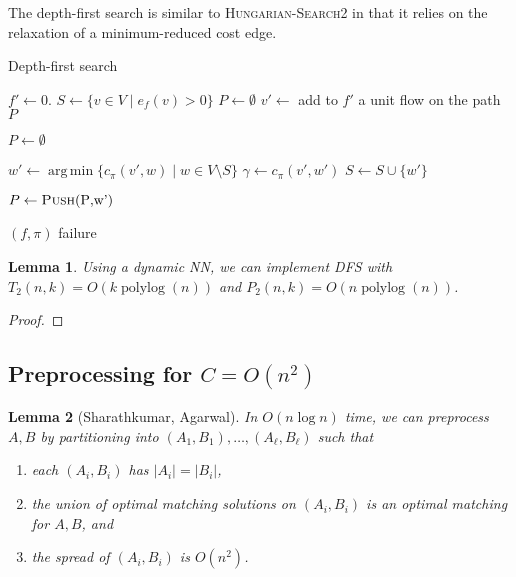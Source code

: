 \documentclass[11pt]{article}
\def\polylog{\mathop{\mathrm{polylog}}}
\DeclareMathOperator*{\argmin}{arg\,min}
\theoremstyle{plain}
\newtheorem{lemma}{Lemma}
\begin{document}
The depth-first search is similar to \textsc{Hungarian-Search2} in that it 
relies on the relaxation of a minimum-reduced cost edge.
\begin{algorithm}
\caption{Depth-first search}
\begin{algorithmic}[1]
	\State $f' \gets 0$.
	\State $S \gets \{v \in V \mid e_f(v) > 0\}$
	\State $P \gets \emptyset$
	\Repeat
		\State $v' \gets$ 
			\State add to $f'$ a unit flow on the path $P$
			
			\State $P \gets \emptyset$
		\EndIf

		\Statex %
		\State $w' \gets \argmin\{c_\pi(v', w) \mid w \in V \setminus S\}$
		\State $\gamma \gets c_\pi(v', w')$
		\Statex %
			\State $S \gets S \cup \{w'\}$
			
			\State $P \gets \Call{Push}{$P$, $w'$}$

		\EndIf




		 
			\State\Return $(f, \pi)$
		\EndIf
	\State\Return failure
\EndFunction
\end{algorithmic}
\end{algorithm}


\begin{lemma}
\label{lemma:goldberg_dfs_time}
	Using a dynamic NN, we can implement \textsc{DFS} with 
	$T_2(n, k) = O(k\polylog(n))$ and $P_2(n, k) = O(n\polylog(n))$.
\end{lemma}
\begin{proof}
\end{proof}








\subsection{Preprocessing for $C = O(n^2)$}

\begin{lemma}[Sharathkumar, Agarwal]
	In $O(n\log n)$ time, we can preprocess $A, B$ by partitioning into
	$(A_1, B_1), \ldots, (A_\ell, B_\ell)$ such that 
	\begin{enumerate}
	\item each $(A_i, B_i)$ has $|A_i| = |B_i|$,
	\item the union of optimal matching solutions on $(A_i, B_i)$
		is an optimal matching for $A, B$, and
	\item the spread of $(A_i, B_i)$ is $O(n^2)$.
	\end{enumerate}
\end{lemma}
\end{document}
